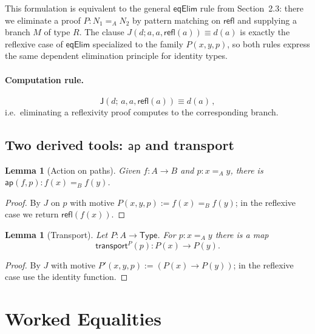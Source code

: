 \documentclass[11pt]{article}
\newcommand{\Type}{\mathsf{Type}}
\newcommand{\Id}[3]{#1 =_{#2} #3}
\newcommand{\refl}{\mathsf{refl}}
\newcommand{\eqelim}{\mathsf{J}}
\newcommand{\ap}{\mathsf{ap}}
\newcommand{\transport}{\mathsf{transport}}
\theoremstyle{definition}
\theoremstyle{plain}
\newtheorem{lemma}[definition]{Lemma}
\theoremstyle{remark}
\begin{document}
This formulation is equivalent to the general $\mathsf{eqElim}$ rule from
Section~2.3: there we eliminate a proof $P : N_1 =_A N_2$ by pattern matching
on $\mathsf{refl}$ and supplying a branch $M$ of type $R$.  The clause
$J(d; a,a,\mathsf{refl}(a)) \equiv d(a)$ is exactly the reflexive case of
$\mathsf{eqElim}$ specialized to the family $P(x,y,p)$, so both rules express
the same dependent elimination principle for identity types.

\paragraph{Computation rule.}
\begin{equation*}
\eqelim(d;\,a,a,\refl(a)) \equiv d(a) \, ,
\end{equation*}
i.e.\ eliminating a reflexivity proof computes to the corresponding branch.

\subsection{Two derived tools: \texorpdfstring{$\ap$}{ap} and transport}
\begin{lemma}[Action on paths]\label{lem:ap}
Given $f{:}A \to B$ and $p{:}\Id{x}{A}{y}$, there is $\ap(f,p){:}\Id{f(x)}{B}{f(y)}$.
\end{lemma}
\begin{proof}
By $J$ on $p$ with motive 
$P(x,y,p) := \Id{f(x)}{B}{f(y)}$; 
in the reflexive case we return $\refl(f(x))$.

\end{proof}

\begin{lemma}[Transport]\label{lem:transport}
Let $P{:}A \to \Type$. For $p{:}\Id{x}{A}{y}$ there is a map
\begin{equation*}
\transport^P(p) : P(x) \to P(y).
\end{equation*}
\end{lemma}
\begin{proof}
By $J$ with motive $P'(x,y,p) := (P(x) \to P(y))$; in the reflexive case use the identity function.
\end{proof}

\section{Worked Equalities}
\end{document}
